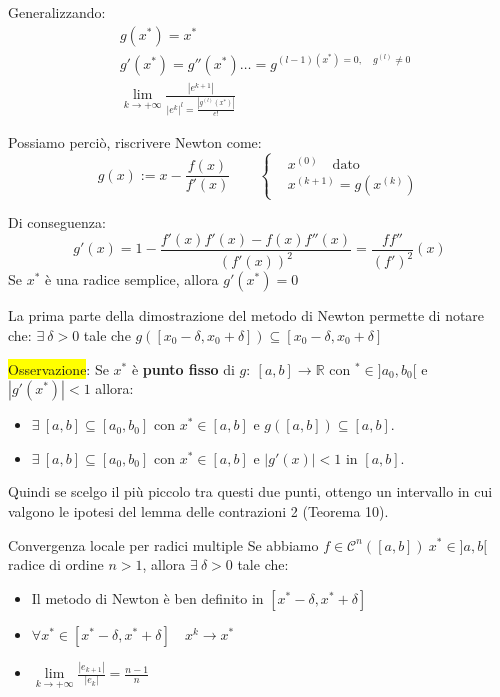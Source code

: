 \documentclass{article}
\begin{document}
Generalizzando:
\begin{align*}
    &g(x^*)=x^*\\
    &g'(x^*)=g''(x^*)\dots = g^{(l-1)(x^*)=0,\quad g^{(l)}\ne0}\\
    &\lim_{k\to+\infty}\frac{\left|e^{k+1}\right|}{\left|e^k\right|^l=\frac{\left|g^{(l)}(x^*)\right|}{e!}}
\end{align*}

Possiamo perciò, riscrivere Newton come:
\[g(x):=x-\frac{f(x)}{f'(x)}\qquad\begin{cases}
    &x^{(0)}\quad\text{dato}\\
    &x^{(k+1)}=g(x^{(k)})
\end{cases}\]

Di conseguenza:
\[g'(x)=1-\frac{f'(x)f'(x)-f(x)f''(x)}{\left(f'(x)\right)^2}=\frac{ff''}{\left(f'\right)^2}(x)\]
Se $x^*$ è una radice semplice, allora $g'(x^*)=0$

La prima parte della dimostrazione del metodo di Newton permette di notare che: $\exists\ \delta>0$ tale che $g\left([x_0-\delta,x_0+\delta]\right)\subseteq[x_0-\delta,x_0+\delta]$

\colorbox{yellow}{Osservazione}: Se $x^*$ è \textbf{punto fisso} di $g:\ [a,b]\to\mathbb R$ con $^*\in]a_0,b_0[$ e $\left|g'(x^*)\right|<1$ allora:
\begin{itemize}
    \item $\exists\ [a,b]\subseteq[a_0,b_0]$ con $x^*\in[a,b]$ e $g([a,b])\subseteq[a,b]$.
    \item $\exists\ [a,b]\subseteq[a_0,b_0]$ con $x^*\in[a,b]$ e $\left|g'(x)\right|<1$ in $[a,b]$.
\end{itemize}
Quindi se scelgo il più piccolo tra questi due punti, ottengo un intervallo in cui valgono le ipotesi del lemma delle contrazioni 2 (Teorema 10).

\begin{theo}{Convergenza locale per radici multiple}{}
    Se abbiamo $f\in\mathcal{C}^n\left([a,b]\right)\ x^*\in]a,b[$ radice di ordine $n>1$, allora $\exists\ \delta>0$ tale che:
    \begin{itemize}
        \item Il metodo di Newton è ben definito in $[x^*-\delta,x^*+\delta]$
        \item $\forall x^*\in[x^*-\delta,x^*+\delta]\quad x^k\to x^*$
        \item \large$\underset{k\to+\infty}{\lim}\frac{\left|e_{k+1}\right|}{\left|e_k\right|}=\frac{n-1}{n}$\normalsize
    \end{itemize}
\end{theo}
\end{document}

